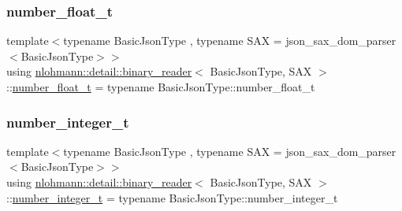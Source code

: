 \subsubsection{\texorpdfstring{number\_float\_t}{number\_float\_t}}
{\footnotesize\ttfamily template$<$typename Basic\+Json\+Type , typename S\+AX  = json\+\_\+sax\+\_\+dom\+\_\+parser$<$\+Basic\+Json\+Type$>$$>$ \\
using \mbox{\hyperlink{classnlohmann_1_1detail_1_1binary__reader}{nlohmann\+::detail\+::binary\+\_\+reader}}$<$ Basic\+Json\+Type, S\+AX $>$\+::\mbox{\hyperlink{classnlohmann_1_1detail_1_1binary__reader_af4488e5400da86636fd2f4d0171bbf53}{number\+\_\+float\+\_\+t}} =  typename Basic\+Json\+Type\+::number\+\_\+float\+\_\+t\hspace{0.3cm}{\ttfamily [private]}}

\mbox{\label{classnlohmann_1_1detail_1_1binary__reader_aa093d9bce6c6ec715a049f2a26d7c4d5}} 
\subsubsection{\texorpdfstring{number\_integer\_t}{number\_integer\_t}}
{\footnotesize\ttfamily template$<$typename Basic\+Json\+Type , typename S\+AX  = json\+\_\+sax\+\_\+dom\+\_\+parser$<$\+Basic\+Json\+Type$>$$>$ \\
using \mbox{\hyperlink{classnlohmann_1_1detail_1_1binary__reader}{nlohmann\+::detail\+::binary\+\_\+reader}}$<$ Basic\+Json\+Type, S\+AX $>$\+::\mbox{\hyperlink{classnlohmann_1_1detail_1_1binary__reader_aa093d9bce6c6ec715a049f2a26d7c4d5}{number\+\_\+integer\+\_\+t}} =  typename Basic\+Json\+Type\+::number\+\_\+integer\+\_\+t\hspace{0.3cm}{\ttfamily [private]}}

\mbox{\label{classnlohmann_1_1detail_1_1binary__reader_a13bb5e2014c4cdf013d8715157cb456e}} 
